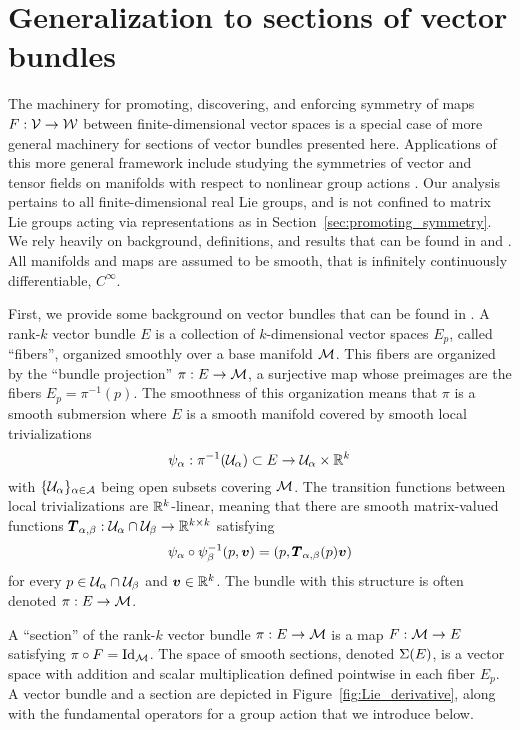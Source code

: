 \documentclass[twoside,11pt]{article}
\begin{document}
\section{Generalization to sections of vector bundles}
\label{sec:sections_of_vector_bundles}
The machinery for promoting, discovering, and enforcing symmetry of maps $F:{\mathcal{V}} \to {\mathcal{W}}$ between finite-dimensional vector spaces is a special case of more general machinery for sections of vector bundles presented here.
Applications of this more general framework include studying the symmetries of vector and tensor fields on manifolds with respect to nonlinear group actions \citep{MarsdenMTAA}.
Our analysis pertains to all finite-dimensional real Lie groups, and is not confined to matrix Lie groups acting via representations as in Section~\ref{sec:promoting_symmetry}.
We rely heavily on background, definitions, and results that can be found in \cite{Lee2013introduction} and \cite{Kolar1993natural}.
All manifolds and maps are assumed to be smooth, that is infinitely continuously differentiable, $C^{\infty}$.

First, we provide some background on vector bundles that can be found in \citet[Chapter~10]{Lee2013introduction}.
A rank-$k$ vector bundle $E$ is a collection of $k$-dimensional vector spaces $E_p$, called ``fibers'', organized smoothly over a base manifold ${\mathcal{M}}$.
This fibers are organized by the ``bundle projection'' $\pi:E \to {\mathcal{M}}$, a surjective map whose preimages are the fibers $E_p = \pi^{-1}(p)$.
The smoothness of this organization means that $\pi$ is a smooth submersion where $E$ is a smooth manifold covered by smooth local trivializations
$$
    \psi_{\alpha}: \pi^{-1}({\mathcal{U}}_{\alpha})\subset E \to {\mathcal{U}}_{\alpha} \times \mathbb{R}^k
$$
with $\{{\mathcal{U}}_{\alpha}\}_{\alpha\in{\mathcal{A}}}$ being open subsets covering ${\mathcal{M}}$.
The transition functions between local trivializations are $\mathbb{R}^k$-linear, meaning that there are smooth matrix-valued functions ${\pmb{T}}_{\alpha, \beta}: {\mathcal{U}}_{\alpha}\cap{\mathcal{U}}_{\beta} \to \mathbb{R}^{k\times k}$ satisfying
\begin{equation}
    \psi_{\alpha} \circ \psi_{\beta}^{-1}(p, {\boldsymbol{v}})
    = (p, {\pmb{T}}_{\alpha, \beta}(p){\boldsymbol{v}})
\end{equation}
for every $p \in {\mathcal{U}}_{\alpha}\cap{\mathcal{U}}_{\beta}$ and ${\boldsymbol{v}} \in \mathbb{R}^k$.
The bundle with this structure is often denoted $\pi: E \to {\mathcal{M}}$.

A ``section'' of the rank-$k$ vector bundle $\pi:E \to {\mathcal{M}}$ is a map $F: {\mathcal{M}} \to E$ satisfying $\pi \circ F = \operatorname{Id}_{{\mathcal{M}}}$.
The space of smooth sections, denoted $\operatorname{\Sigma}(E)$, is a vector space with addition and scalar multiplication defined pointwise in each fiber $E_p$.
A vector bundle and a section are depicted in Figure~\ref{fig:Lie_derivative}, along with the fundamental operators for a group action that we introduce below.
\end{document}
